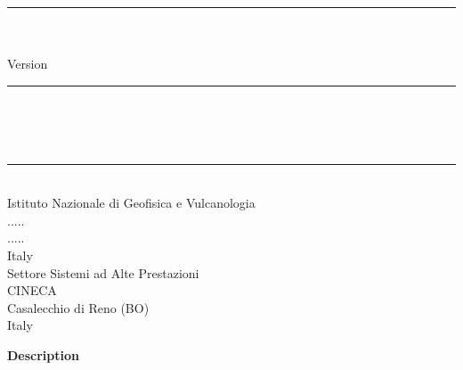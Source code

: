 
\thispagestyle{empty}

\vspace*{0.3in}

\begin{centering}
  \rule{6in}{0.04in}				\\	\vspace{0.25in}
  {\Huge \PDAC\ \DOCTITLE}			\\	\vspace{0.25in}
  {\Large Version \PDACVERSION}			\\	\vspace{0.20in}
  \rule{6in}{0.04in}				\\	\vspace{0.25in}
  {\Large \PDACAUTHORS}				\\	\vspace{0.20in}
  \PDACDATE					\\	\vspace{0.20in}
  \rule{6in}{0.04in}				\\	\vspace{0.25in}
  {\large       Istituto Nazionale di Geofisica e Vulcanologia} \\ 
  {\large       ..... }  \\ 
  {\large       ..... }                                \\ 
  {\large       Italy }                             \\
  {\large       Settore Sistemi ad Alte Prestazioni } \\ 
  {\large       CINECA }  \\ 
  {\large       Casalecchio di Reno (BO) }                                \\ 
  {\large       Italy }                             \\
\end{centering}
\vspace{0.2in}

\begin{center}
  {\Large \bf Description}
\end{center}

\noindent \DOCDESC

